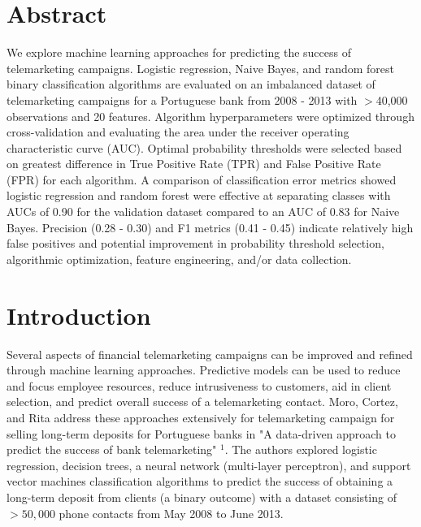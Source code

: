 \documentclass[11pt]{article}
\begin{document}
\maketitle



\section{Abstract}
\label{S:1}
We explore machine learning approaches for predicting the success of telemarketing campaigns. Logistic regression, Naive Bayes, and random forest binary classification algorithms are evaluated on an imbalanced dataset of telemarketing campaigns for a Portuguese bank from 2008 - 2013 with $>$40,000 observations and 20 features. Algorithm hyperparameters were optimized through cross-validation and evaluating the area under the receiver operating characteristic curve (AUC). Optimal probability thresholds were selected based on greatest difference in True Positive Rate (TPR) and False Positive Rate (FPR) for each algorithm. A comparison of classification error metrics showed logistic regression and random forest were effective at separating classes with AUCs of 0.90 for the validation dataset compared to an AUC of 0.83 for Naive Bayes. Precision (0.28 - 0.30) and F1 metrics (0.41 - 0.45) indicate relatively high false positives and potential improvement in probability threshold selection, algorithmic optimization, feature engineering, and/or data collection.

\section{Introduction}
\label{S:2}
Several aspects of financial telemarketing campaigns can be improved and refined through machine learning approaches. Predictive models can be used to reduce and focus employee resources, reduce intrusiveness to customers, aid in client selection, and predict overall success of a telemarketing contact. Moro, Cortez, and Rita address these approaches extensively for telemarketing campaign for selling long-term deposits for Portuguese banks in "A data-driven approach to predict the success of bank telemarketing" $^1$. The authors explored logistic regression, decision trees, a neural network (multi-layer perceptron), and support vector machines classification algorithms to predict the success of obtaining a long-term deposit from clients (a binary outcome) with a dataset consisting of $>50,000$ phone contacts from May 2008 to June 2013. \\
\end{document}
